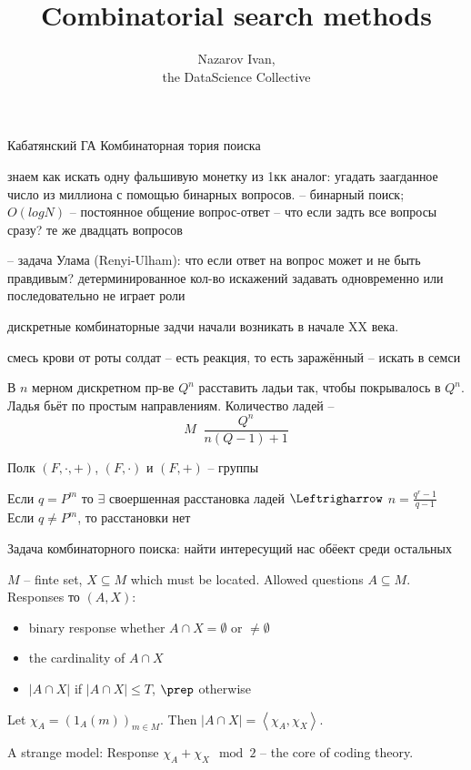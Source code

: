 \documentclass[a4paper]{article}
\title{Combinatorial search methods}
\author{Nazarov Ivan, \rus{101мНОД(ИССА)}\\the DataScience Collective}
\newcommand{\brac}[1]{{\left ( #1 \right )}}
\newcommand{\abs}[1]{{\left | #1 \right |}}
\newcommand{\brkt}[1]{{\left\langle #1 \right\rangle}}
\newcommand{\defn}{\mathop{\overset{\Delta}{=}}\nolimits}
\newcommand{\eng}[1]{\foreignlanguage{english}{#1}}
\begin{document}
\maketitle


Кабатянский ГА
Комбинаторная тория поиска

знаем как искать одну фальшивую монетку из 1кк
аналог: угадать заагданное число из миллиона с помощью бинарных вопросов.
-- бинарный поиск; $O(log N)$
-- постоянное общение вопрос-ответ
-- что если задть все вопросы сразу? те же двадцать вопросов

-- задача Улама (\eng{Renyi-Ulham}): что если ответ на вопрос может и не быть правдивым?
	детерминированное кол-во искажений
	задавать одновременно или последовательно не играет роли

дискретные комбинаторные задчи начали возникать в начале \eng{XX} века.

смесь крови от роты солдат -- есть реакция, то есть заражённый -- искать в семси

В $n$ мерном дискретном пр-ве $Q^n$ расставить ладьи так, чтобы покрывалось в $Q^n$.
Ладья бьёт по простым направлениям.
Количество ладей -- \[M \defn \frac{Q^n}{n (Q-1)+1}\]

Полк $(F,\cdot,+)$, $(F,\cdot)$ и $(F,+)$ -- группы 

Если $q = P^m$ то $\exists$ своершенная расстановка ладей $\Leftrigharrow$ $n=\frac{q^r-1}{q-1}$
Если $q\neq P^m$, то расстановки нет

Задача комбинаторного поиска:
найти интересущий нас обёект среди остальных

$M$ -- finte set, $X\subseteq M$ which must be located.
Allowed questions $A\subseteq M$. Responses то $(A,X)$:\begin{itemize}
	\item binary response whether $A\cap X = \emptyset$ or $\neq \emptyset$
	\item the cardinality of $A\cap X$
	\item $\abs{A\cap X}$ if $\abs{A\cap X}\leq T$, $\prep$ otherwise
\end{itemize}


Let $\chi_A = \brac{1_A(m)}_{m\in M}$. Then $\abs{A\cap X} = \brkt{\chi_A,\chi_X}$.

A strange model:
Response $\chi_A+\chi_X\mod{2}$ -- the core of coding theory.
\end{document}
